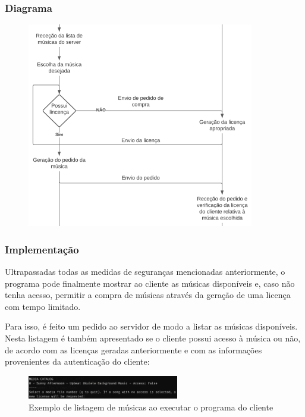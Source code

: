 \documentclass[10pt,english]{article}
\begin{document}
\subsubsection{Diagrama}
\vspace*{1cm}
    \begin{figure}[!h]
            \centering
            \includegraphics[width=375]{images/8.png}
    \end{figure}

\clearpage

\subsubsection{Implementação}

\par Ultrapassadas todas as medidas de seguranças mencionadas anteriormente, o programa pode finalmente mostrar ao cliente as músicas disponíveis e, caso não tenha acesso, permitir a compra de músicas através da geração de uma licença com tempo limitado.

\par Para isso, é feito um pedido ao servidor de modo a listar as músicas disponíveis. Nesta listagem é também apresentado se o cliente possui acesso à música ou não, de acordo com as licenças geradas anteriormente e com as informações provenientes da autenticação do cliente:

\begin{figure}[!h]
        \centering
        \includegraphics[width=250]{images/catalog_running.png}
        \caption{Exemplo de listagem de músicas ao executar o programa do cliente}
\end{figure}
\end{document}
